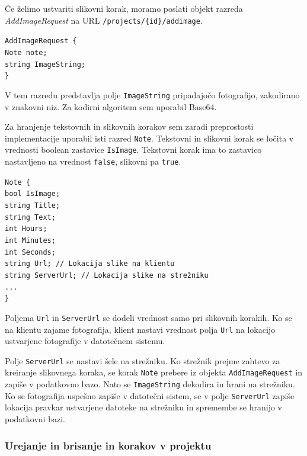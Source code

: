 \documentclass[a4paper, 12pt]{book}
\begin{document}
Če želimo ustvariti slikovni korak, moramo poslati objekt razreda \textit{AddImageRequest} na URL \texttt{/projects/\{id\}/addimage}.

\noindent \texttt{AddImageRequest \{ \\
Note note; \\
string ImageString;  \\
\} }

V tem razredu predstavlja polje \texttt{ImageString} pripadajočo fotografijo, zakodirano v znakovni niz.
Za kodirni algoritem sem uporabil Base64.

Za hranjenje tekstovnih in slikovnih korakov sem zaradi preprostosti implementacije uporabil isti razred \texttt{Note}.
Tekstovni in slikovni korak se ločita v vrednosti boolean zastavice \texttt{IsImage}.
Tekstovni korak ima to zastavico nastavljeno na vrednost \texttt{false}, slikovni pa \texttt{true}.

\noindent \texttt{Note \{ \\
bool IsImage;  \\
string Title; \\
string Text; \\
int Hours; \\
int Minutes; \\
int Seconds; \\
string Url; // Lokacija slike na klientu \\
string ServerUrl; // Lokacija slike na strežniku \\
... \\
\}
}

Poljema \texttt{Url} in \texttt{ServerUrl} se dodeli vrednost samo pri slikovnih korakih.
Ko se na klientu zajame fotografija, klient nastavi vrednost polja \texttt{Url} na lokacijo ustvarjene fotografije v datotečnem sistemu.

Polje \texttt{ServerUrl} se nastavi šele na strežniku.
Ko strežnik prejme zahtevo za kreiranje slikovnega koraka, se korak \texttt{Note} prebere iz objekta \texttt{AddImageRequest} in zapiše v podatkovno bazo.
Nato se \texttt{ImageString} dekodira in hrani na strežniku.
Ko se fotografija uspešno zapiše v datotečni sistem, se v polje \texttt{ServerUrl} zapiše lokacija pravkar ustvarjene datoteke na strežniku in spremembe se hranijo v podatkovni bazi.

\subsubsection{Urejanje in brisanje in korakov v projektu}
\end{document}
